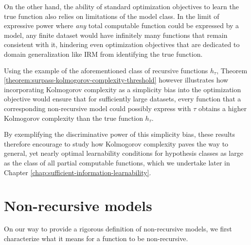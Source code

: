 On the other hand, the ability of standard optimization objectives to learn the true function also relies on limitations of the model class.
In the limit of expressive power where \textit{any} total computable function could be expressed by a model, any finite dataset would have infinitely many functions that remain consistent with it, hindering even optimization objectives that are dedicated to domain generalization like IRM from identifying the true function.

Using the example of the aforementioned class of recursive functions $h_\tau$, Theorem \ref{theorem:surpass-kolmogorov-complexity-threshold} however illustrates how incorporating Kolmogorov complexity as a simplicity bias into the optimization objective would ensure that for sufficiently large datasets, every function that a corresponding non-recursive model could possibly express with $\tau$ obtains a higher Kolmogorov complexity than the true function $h_\tau$.

By exemplifying the discriminative power of this simplicity bias, these results therefore encourage to study how Kolmogorov complexity paves the way to general, yet nearly optimal learnability conditions for hypothesis classes as large as the class of all partial computable functions, which we undertake later in Chapter \ref{chap:sufficient-information-learnability}.

\section{Non-recursive models}
\label{sec:non-recursive-models}
On our way to provide a rigorous definition of non-recursive models, we first characterize what it means for a function to be non-recursive.


